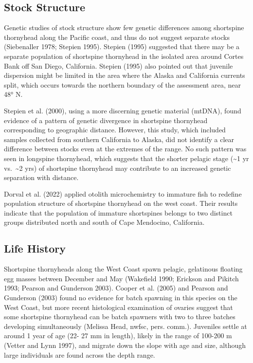 \documentclass[11pt,
  english,
  letterpaper,
]{article}
\begin{document}
\hypertarget{stock-structure}{%
\subsection{Stock Structure}\label{stock-structure}}

Genetic studies of stock structure show few genetic differences among shortspine thornyhead along the Pacific coast, and thus do not suggest separate stocks (Siebenaller 1978; Stepien 1995). Stepien (1995) suggested that there may be a separate population of shortspine thornyhead in the isolated area around Cortes Bank off San Diego, California. Stepien (1995) also pointed out that juvenile dispersion might be limited in the area where the Alaska and California currents split, which occurs towards the northern boundary of the assessment area, near 48° N.

Stepien et al. (2000), using a more discerning genetic material (mtDNA), found evidence of a pattern of genetic divergence in shortspine thornyhead corresponding to geographic distance. However, this study, which included samples collected from southern California to Alaska, did not identify a clear difference between stocks even at the extremes of the range. No such pattern was seen in longspine thornyhead, which suggests that the shorter pelagic stage (\textasciitilde1 yr vs.~\textasciitilde2 yrs) of shortspine thornyhead may contribute to an increased genetic separation with distance.

Dorval et al. (2022) applied otolith microchemistry to immature fish to redefine population structure of shortspine thornyhead on the west coast. Their results indicate that the population of immature shortspines belongs to two distinct groups distributed north and south of Cape Mendocino, California.

\hypertarget{life-history}{%
\subsection{Life History}\label{life-history}}

Shortspine thornyheads along the West Coast spawn pelagic, gelatinous floating egg masses between December and May (Wakefield 1990; Erickson and Pikitch 1993; Pearson and Gunderson 2003). Cooper et al. (2005) and Pearson and Gunderson (2003) found no evidence for batch spawning in this species on the West Coast, but more recent histological examination of ovaries suggest that some shortspine thornyhead can be batch spawners with two to three batches developing simultaneously (Melissa Head, \gls{nwfsc}, pers. comm.). Juveniles settle at around 1 year of age (22- 27 mm in length), likely in the range of 100-200 m (Vetter and Lynn 1997), and migrate down the slope with age and size, although large individuals are found across the depth range.
\end{document}
